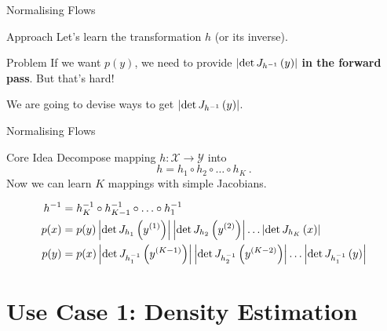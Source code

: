 \documentclass[14pt]{beamer}
\begin{document}
\begin{frame}{Normalising Flows}
\begin{block}{Approach}
Let's learn the transformation $ h $ (or its inverse).
\end{block}
\begin{block}{Problem}
If we want $ p(y) $, we need to provide $ \left|\det J_{h^{-1}}\left(y\right)\right| $ \textbf{in the forward pass}. But that's hard!
\end{block}
We are going to devise ways to get $ \left|\det J_{h^{-1}}\left(y\right)\right| $.
\end{frame}

\begin{frame}{Normalising Flows}
\begin{block}{Core Idea}
Decompose mapping $ h: \mathcal{X} \rightarrow \mathcal{Y} $ into 
\begin{equation*}
h = h_{1}\circ h_{2}\circ\ldots\circ h_K \ .
\end{equation*}
Now we can learn $ K $ mappings with simple Jacobians.
\begin{small}
\begin{equation*}
\begin{aligned}
h^{-1} &= h_{K}^{-1}\circ h_{K-1}^{-1} \circ \ldots \circ h_{1}^{-1} \\
p(x) &= p(y)\left|\det J_{h_{1}}\left(y^{(1)}\right)\right|\left|\det J_{h_{2}}\left(y^{(2)}\right)\right|\ldots\left|\det J_{h_{K}}\left(x\right)\right| \\
p(y) &= p(x)\left|\det J_{h_{1}^{-1}}\left(y^{(K-1)}\right)\right|\left|\det J_{h_{2}^{-1}}\left(y^{(K-2)}\right)\right|\ldots\left|\det J_{h_{1}^{-1}}\left(y\right)\right|
\end{aligned}
\end{equation*}
\end{small}
\end{block}
\end{frame}

\section{Use Case 1: Density Estimation}
\begin{frame}
\tableofcontents[current]
\end{frame}
\end{document}
